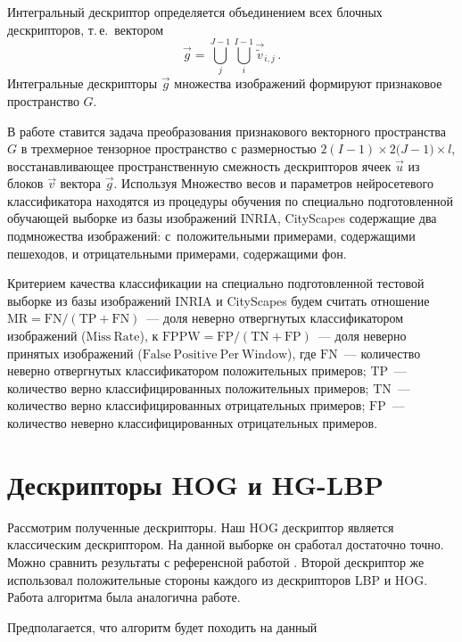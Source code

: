 \documentclass[12pt,twoside]{article}
\begin{document}
Интегральный дескриптор определяется объединением всех
блочных дескрипторов, т.\,е.\ вектором
\begin{equation}
\vec {g}=\bigcup_j^{J-1}{\bigcup_i^{I-1}{\vec{\tilde{v}}_{i,j}}}\,.
\end{equation}
Интегральные дескрипторы $\vec{g}$ множества изображений формируют
признаковое пространство $G$. 

В работе ставится задача преобразования признакового векторного пространства $G$ в трехмерное тензорное пространство с размерностью ${2(I-1)}\times{2(J-1})\times{l}$, восстанавливающее пространственную смежность дескрипторов ячеек $\vec{u}$ из блоков $\vec{v}$ вектора $\vec{g}$. Используя
Множество весов и параметров нейросетевого классификатора находятся из процедуры обучения по специально подготовленной 
обучающей выборке из базы изображений INRIA, CityScapes \cite{inria} содержащие два подмножества изображений: 
с~положительными примерами, содержащими пешеходов, и отрицательными примерами, содержащими фон.

	Критерием качества классификации  на специально
	подготовленной тестовой выборке из базы изображений INRIA \cite{inria} и CityScapes
	будем считать отношение $\mathrm{MR} = \mathrm{FN}/(\mathrm{TP}+\mathrm{FN})$~---
	доля неверно отвергнутых классификатором изображений ($\mathrm{Miss\ Rate}$),
	к $\mathrm{FPPW} = \mathrm{FP}/(\mathrm{TN}+\mathrm{FP})$~---
	доля неверно принятых изображений ($\mathrm{False\ Positive\ Per\
	Window}$), где $\mathrm{FN}$~--- количество неверно отвергнутых
	классификатором положительных примеров; $\mathrm{TP}$~---
	количество верно классифицированных положительных примеров;
	$\mathrm{TN}$~--- количество верно классифицированных отрицательных
	примеров; $\mathrm{FP}$~--- количество неверно классифицированных отрицательных примеров.


\section{Дескрипторы HOG и HG-LBP}
Рассмотрим полученные дескрипторы. Наш HOG дескриптор является классическим дескриптором. На данной выборке он сработал достаточно точно. Можно сравнить результаты с референсной работой \cite{Wang09}.
Второй дескриптор же использовал положительные стороны каждого из дескрипторов LBP и HOG. Работа алгоритма была аналогична работе\cite{Wang09}. 

Предполагается, что алгоритм будет походить на данный
\end{document}
